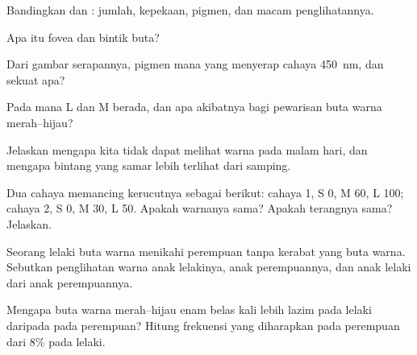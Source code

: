\begin{exercise}[$\star$]\label{exo:g11:the-eye:2}
Bandingkan  dan : jumlah, kepekaan, pigmen, dan
macam penglihatannya.
\end{exercise}

\begin{exercise}[$\star$]\label{exo:g11:the-eye:3}
Apa itu fovea dan bintik buta?
\end{exercise}

\begin{exercise}[$\star$]\label{exo:g11:the-eye:4}
Dari gambar serapannya, pigmen mana yang menyerap cahaya
\qty{450}{nm}, dan sekuat apa?
\end{exercise}

\begin{exercise}[$\star$]\label{exo:g11:the-eye:5}
Pada  mana   L dan M berada, dan apa akibatnya bagi
pewarisan buta warna merah--hijau?
\end{exercise}

\begin{exercise}[$\star\star$]\label{exo:g11:the-eye:6}
Jelaskan mengapa kita tidak dapat melihat warna pada malam hari, dan
mengapa bintang yang samar lebih terlihat dari samping.
\end{exercise}

\begin{exercise}[$\star\star$]\label{exo:g11:the-eye:7}
Dua cahaya memancing kerucutnya sebagai berikut: cahaya 1, S 0, M 60, L
100; cahaya 2, S 0, M 30, L 50. Apakah warnanya sama? Apakah
terangnya sama? Jelaskan.
\end{exercise}

\begin{exercise}[$\star\star$]\label{exo:g11:the-eye:8}
Seorang lelaki buta warna menikahi perempuan tanpa kerabat yang buta
warna. Sebutkan penglihatan warna anak lelakinya, anak perempuannya,
dan anak lelaki dari anak perempuannya.
\end{exercise}

\begin{exercise}[$\star\star$]\label{exo:g11:the-eye:9}
Mengapa buta warna merah--hijau enam belas kali lebih lazim pada lelaki
daripada pada perempuan? Hitung frekuensi yang diharapkan pada
perempuan dari 8\% pada lelaki.
\end{exercise}

